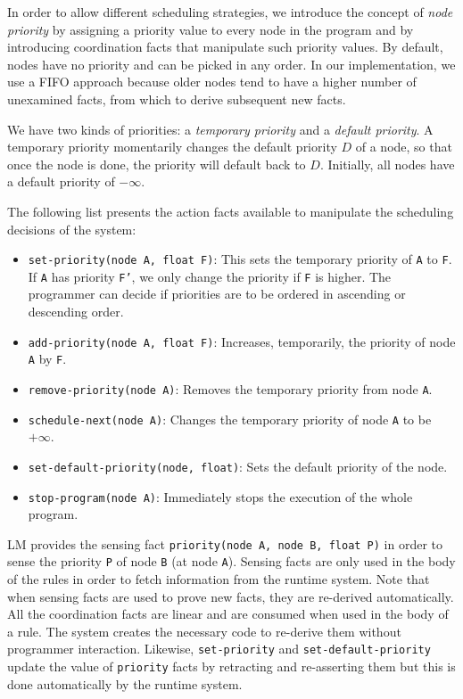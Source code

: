 
In order to allow different scheduling strategies, we introduce the concept of
\emph{node priority} by assigning a priority value to every node in the program
and by introducing coordination facts that manipulate such priority values.  By
default, nodes have no priority and can be picked in any order. In our
implementation, we use a FIFO approach because older nodes tend to have a higher
number of unexamined facts, from which to derive subsequent new facts.

We have two kinds of priorities: a \emph{temporary priority} and a \emph{default
   priority}. A temporary priority momentarily changes the default priority $D$
of a node, so that once the node is done, the priority will default back to $D$.
Initially, all nodes have a default priority of $-\infty$.

The following list presents the action facts available to manipulate the
scheduling decisions of the system:

\newcommand{\code}[1]{\texttt{#1}}

\begin{itemize}
   \item \code{set-priority(node A, float F)}: This sets the
   temporary priority of \texttt{A} to \texttt{F}. If \texttt{A} has priority
   \texttt{F'}, we only change the priority if \texttt{F} is higher. The programmer
   can decide if priorities are to be ordered in ascending or descending order.
   \item \code{add-priority(node A, float F)}: Increases,
   temporarily, the priority of node \texttt{A} by \texttt{F}.
   \item \code{remove-priority(node A)}: Removes the temporary priority from node
   \texttt{A}.
   \item \code{schedule-next(node A)}: Changes the temporary priority of node
   \texttt{A} to be $+\infty$.
   \item \code{set-default-priority(node, float)}: Sets the default
   priority of the node.
   \item \code{stop-program(node A)}: Immediately stops the
   execution of the whole program.
\end{itemize}

LM provides the sensing fact \code{priority(node A, node B, float P)} in order
to sense the priority \texttt{P} of node \texttt{B} (at node \texttt{A}).
Sensing facts are only used in the body of the rules in order to fetch
information from the runtime system.  Note that when sensing facts are used to
prove new facts, they are re-derived automatically. All the coordination facts
are linear and are consumed when used in the body of a rule. The system creates
the necessary code to re-derive them without programmer interaction.  Likewise,
\texttt{set-priority} and \texttt{set-default-priority} update the value of
\texttt{priority} facts by retracting and re-asserting them but this is done
automatically by the runtime system.

